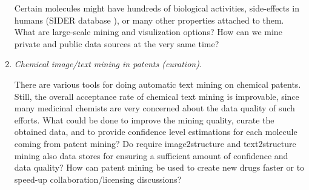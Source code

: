 \documentclass{sig-alternate}
\begin{document}
\begin{enumerate}
  Certain molecules might have hundreds of biological activities,
  side-effects in humans (SIDER database
  \cite{Kuhn_Campillos_Letunic_Jensen_Bork_2010}), or many other
  properties attached to them. What are large-scale mining and
  visulization options?  How can we mine private and public data
  sources at the very same time?
%
\item \emph{Chemical image/text mining in patents (curation)}.

  There are various tools for doing automatic text mining on chemical
  patents. Still, the overall acceptance rate of chemical text mining
  is improvable, since many medicinal chemists are very concerned
  about the data quality of such efforts.  What could be done to
  improve the mining quality, curate the obtained data, and to provide
  confidence level estimations for each molecule coming from patent
  mining? Do require image2structure and text2structure mining also
  data stores for ensuring a sufficient amount of confidence and data
  quality?  How can patent mining be used to create new drugs faster
  or to speed-up collaboration/licensing discussions?
\end{enumerate}
\end{document}
